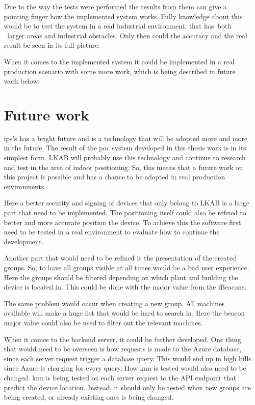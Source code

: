 \bigskip

Due to the way the tests were performed the results from them can give a pointing finger how the implemented system works.
Fully knowledge about this would be to test the system in a real industrial environment, that has both  larger areas and industrial obstacles.
Only then could the accuracy and the real result be seen in its full picture.

\bigskip

When it comes to the implemented system it could be implemented in a real production scenario with some more work, which is being described in future work below.


\section{Future work}\label{sec:conclusionFutureWork}
\Acrshort{ips}'s has a bright future and is a technology that will be adopted more and more in the future.
The result of the \acrshort{poc} system developed in this thesis work is in its simplest form.
LKAB will probably use this technology and continue to research and test in the area of indoor positioning.
So, this means that a future work on this project is possible and has a chance to be adopted in real production environments.

\bigskip

Here a better security and signing of devices that only belong to LKAB is a large part that need to be implemented.
The positioning itself could also be refined to better and more accurate position the device. 
To achieve this the software first need to be tested in a real environment to evaluate how to continue the development.

\bigskip

Another part that would need to be refined is the presentation of the created groups.
So, to have all groups visible at all times would be a bad user experience.
Here the groups should be filtered depending on which plant and building the device is located in.
This could be done with the major value from the iBeacons.

\bigskip

The same problem would occur when creating a new group.
All machines available will make a huge list that would be hard to search in.
Here the beacon major value could also be used to filter out the relevant machines.

\bigskip

When it comes to the backend server, it could be further developed.
One thing that would need to be overseen is how requests is made to the Azure database, since each server request trigger a database query.
This would end up in high bills since Azure is charging for every query.
How \acrfull{knn} is tested would also need to be changed.
\acrshort{knn} is being tested on each server request to the API endpoint that predict the device location.
Instead, it should only be tested when new groups are being created, or already existing ones is being changed.

